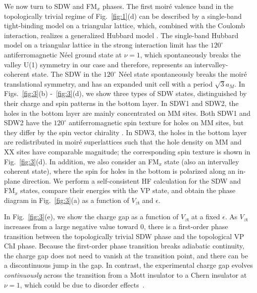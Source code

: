 \documentclass[aps,prl,twocolumn,superscriptaddress,longbibliography]{revtex4-2}
\begin{document}
We now turn to SDW and FM$_x$ phases. The first moir\'e valence band in the topologically trivial regime of Fig.~\ref{fig:1}(d) can be described by a single-band tight-binding model on a triangular lattice, which, combined with the Coulomb interaction, realizes a generalized Hubbard model \cite{wu2018hubbard}. The single-band Hubbard model on a triangular lattice in the strong interaction limit has the $120^{\circ}$ antiferromagnetic N\'eel ground state \cite{wu2018hubbard,hu2021competing} at $\nu=1$, which spontaneously breaks the valley U(1) symmetry in our case and therefore, represents an intervalley-coherent state. The SDW in the $120^{\circ}$  N\'eel state spontaneously breaks the moir\'e translational symmetry, and has an expanded unit cell with a period $\sqrt{3} a_M$. In Figs.~\ref{fig:3}(b) -~\ref{fig:3}(d), we show three types of SDW states, distinguished by their charge and spin patterns in the bottom layer. In SDW1 and SDW2, the holes in the bottom layer are mainly concentrated on MM sites. Both SDW1 and SDW2 have the $120^{\circ}$  antiferromagnetic spin texture for holes on MM sites, but they differ by the spin vector chirality \cite{pan2020band}. In SDW3, the holes in the bottom layer are redistributed in moir\'e superlattices such that the hole density on MM and XX sites have comparable magnitude; the corresponding spin texture is shown in  Fig.~\ref{fig:3}(d). In addition, we also consider an FM$_x$ state (also an intervalley coherent state), where the spin for holes in the bottom is polarized along an in-plane direction. We perform a self-consistent HF calculation for the SDW and FM$_x$ states, compare their energies with the VP state, and obtain the phase diagram in Fig.~\ref{fig:3}(a) as a function of $V_{z\mathfrak{t}}$ and $\epsilon$.  

In Fig.~\ref{fig:3}(e), we show the charge gap as a function of $V_{z\mathfrak{t}}$ at a fixed $\epsilon$. As $V_{z\mathfrak{t}}$ increases from a large negative value toward 0, there is a first-order phase transition between the topologically trivial SDW phase and the topological VP ChI phase. Because the first-order phase transition breaks adiabatic continuity, the charge gap does not need to vanish at the transition point, and there can be a discontinuous jump in the gap. In contrast, the experimental charge gap \cite{li2021quantum} evolves {\it continuously} across the transition from a Mott insulator to a Chern insulator at $\nu=1$, which could be due to disorder effects~\cite{ahn2022disorderinduced}.
\end{document}
